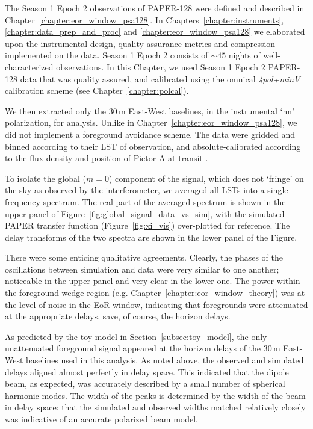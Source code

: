 The Season 1 Epoch 2 observations of PAPER-128 were defined and described in Chapter~\ref{chapter:eor_window_psa128}. In Chapters~\ref{chapter:instruments}, \ref{chapter:data_prep_and_proc} and \ref{chapter:eor_window_psa128} we elaborated upon the instrumental design, quality assurance metrics and compression implemented on the data. Season 1 Epoch 2 consists of $\sim 45$ nights of well-characterized observations. In this Chapter, we used Season 1 Epoch 2 PAPER-128 data that was quality assured, and calibrated using the {\sc omnical} \citep{Zheng.14} \textit{4pol+minV} calibration scheme (see Chapter~\ref{chapter:polcal}). 

We then extracted only the 30\,m East-West baselines, in the instrumental `nn' polarization, for analysis. Unlike in Chapter~\ref{chapter:eor_window_psa128}, we did not implement a foreground avoidance scheme. The data were gridded and binned according to their LST of observation, and absolute-calibrated according to the flux density and position of Pictor A at transit \citep[][the same calibration shown in Chapter~\ref{chapter:eor_window_psa128}]{Jacobs.13}.

To isolate the global ($m=0$) component of the signal, which does not `fringe' on the sky as observed by the interferometer, we averaged all LSTs into a single frequency spectrum. The real part of the averaged spectrum is shown in the upper panel of Figure~\ref{fig:global_signal_data_vs_sim}, with the simulated PAPER transfer function (Figure~\ref{fig:xi_vis}) over-plotted for reference. The delay transforms of the two spectra are shown in the lower panel of the Figure.

There were some enticing qualitative agreements. Clearly, the phases of the oscillations between simulation and data were very similar to one another; noticeable in the upper panel and very clear in the lower one. 
The power within the foreground wedge region (e.g. Chapter~\ref{chapter:eor_window_theory}) was at the level of noise in the EoR window, indicating that foregrounds were attenuated at the appropriate delays, save, of course, the horizon delays.

As predicted by the toy model in Section~\ref{subsec:toy_model}, the only unattenuated foreground signal appeared at the horizon delays of the 30\,m East-West baselines used in this analysis. As noted above, the observed and simulated delays aligned almost perfectly in delay space. This indicated that the dipole beam, as expected, was accurately described by a small number of spherical harmonic modes. The width of the peaks is determined by the width of the beam in delay space: that the simulated and observed widths matched relatively closely was indicative of an accurate polarized beam model. 

